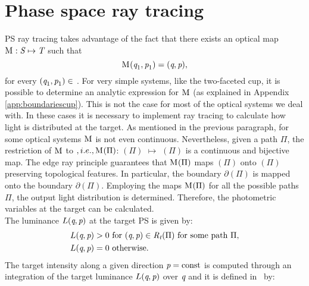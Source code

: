\section{Phase space ray tracing}\label{sec:PS_raytracing}
PS ray tracing takes advantage of the fact that there exists an optical map
$
\mathrm{M}_{\textit{}}: \mbox{$\emph{S}_{\textit{}}$} \mapsto \mbox{$\emph{T}_{\textit{}}$}
$
 such that
\begin{equation}\label{eq:map1}
\mathrm{M}_{\textit{}}(\textit{q}_1,\textit{p}_1)=(\textit{q},\textit{p}),
\end{equation} for every $(\textit{q}_1,\textit{p}_1)\in$ .
For very simple systems, like the two-faceted cup, it is possible to determine an analytic expression for $\mathrm{M}_{\textit{}}$ (as explained in Appendix \ref{app:boundariescup}).
This is not the case for most of the optical systems we deal with. In these cases it is necessary to implement ray tracing to calculate how light is distributed at the target.
As mentioned in the previous paragraph, for some optical systems $\mathrm{M}_{\textit{}}$ is not even continuous.
Nevertheless, given a path $\Pi$, the restriction of $\mathrm{M}_{\textit{}}$ to $, i.e., \mathrm{M}_{\textit{}}(\Pi)$: $(\Pi)$ $\mapsto$ $(\Pi)$ is a continuous and bijective map. 
The edge ray principle guarantees that $\mathrm{M}_{\textit{}}(\Pi)$ maps $(\Pi)$ onto $(\Pi)$ preserving topological features. In particular, the boundary $\partial$$(\Pi)$ is mapped onto the boundary $\partial$$(\Pi)$. %
Employing the maps $\mathrm{M}_{\textit{}}(\Pi)$ for all the possible paths $\Pi$, the output light distribution is determined. Therefore, the photometric variables at the target can be calculated.
\\ \indent The luminance $L(\textit{q}, \textit{p})$ at the target PS is given by:
\begin{equation}
\begin{aligned}
\label{eq:PSluminance}
L(\variabile{q}, \variabile{p}) &> 0  \mbox{  for } (\variabile{q}, \variabile{p})\in \mbox{\set{R}{\textrm{t}}{}}(\Pi) \mbox{ for some path } \Pi,\\ \vspace{0.5 cm}
L(\variabile{q}, \variabile{p}) &= 0  \mbox{  otherwise}.
\end{aligned}
\end{equation}
The target intensity along a given direction $\textit{p}=\textrm{const}$ is computed through an integration of the target luminance $L(\textit{q}, \textit{p})$ over $\textit{q}$ and it is defined in $\,$ by:
